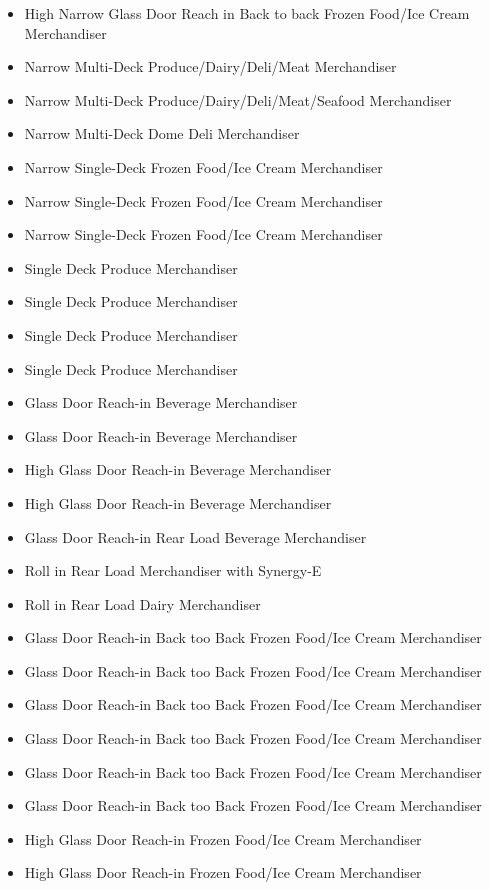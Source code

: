 \begin{itemize}
\item
  High Narrow Glass Door Reach in Back to back Frozen Food/Ice Cream Merchandiser
\item
  Narrow Multi-Deck Produce/Dairy/Deli/Meat Merchandiser
\item
  Narrow Multi-Deck Produce/Dairy/Deli/Meat/Seafood Merchandiser
\item
  Narrow Multi-Deck Dome Deli Merchandiser
\item
  Narrow Single-Deck Frozen Food/Ice Cream Merchandiser
\item
  Narrow Single-Deck Frozen Food/Ice Cream Merchandiser
\item
  Narrow Single-Deck Frozen Food/Ice Cream Merchandiser
\item
  Single Deck Produce Merchandiser
\item
  Single Deck Produce Merchandiser
\item
  Single Deck Produce Merchandiser
\item
  Single Deck Produce Merchandiser
\item
  Glass Door Reach-in Beverage Merchandiser
\item
  Glass Door Reach-in Beverage Merchandiser
\item
  High Glass Door Reach-in Beverage Merchandiser
\item
  High Glass Door Reach-in Beverage Merchandiser
\item
  Glass Door Reach-in Rear Load Beverage Merchandiser
\item
  Roll in Rear Load Merchandiser with Synergy-E
\item
  Roll in Rear Load Dairy Merchandiser
\item
  Glass Door Reach-in Back too Back Frozen Food/Ice Cream Merchandiser
\item
  Glass Door Reach-in Back too Back Frozen Food/Ice Cream Merchandiser
\item
  Glass Door Reach-in Back too Back Frozen Food/Ice Cream Merchandiser
\item
  Glass Door Reach-in Back too Back Frozen Food/Ice Cream Merchandiser
\item
  Glass Door Reach-in Back too Back Frozen Food/Ice Cream Merchandiser
\item
  Glass Door Reach-in Back too Back Frozen Food/Ice Cream Merchandiser
\item
  High Glass Door Reach-in Frozen Food/Ice Cream Merchandiser
\item
  High Glass Door Reach-in Frozen Food/Ice Cream Merchandiser

\end{itemize}
